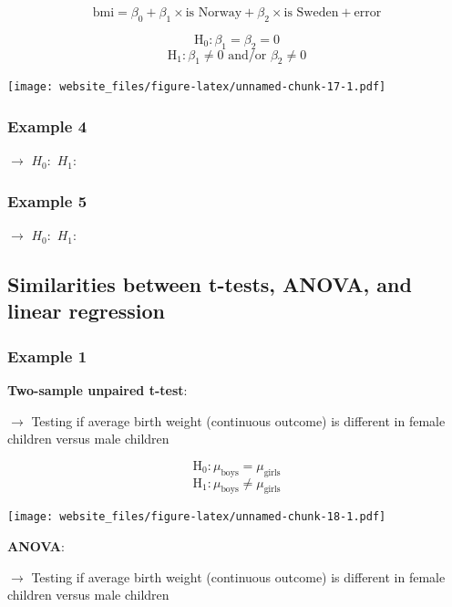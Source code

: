 \documentclass[12pt,]{article}
\begin{document}
\[\text{bmi} = \beta_0 + \beta_1 \times \text{is Norway} + \beta_2 \times \text{is Sweden} + \text{error}\]

\[\text{H}_0: \beta_1 = \beta_2 = 0\]
\[\text{H}_1: \beta_1 \ne 0 \text{ and/or } \beta_2 \ne 0\]

\texttt{[image: website\_files/figure-latex/unnamed-chunk-17-1.pdf]}

\subsubsection{Example 4}\label{example-4-4}

\(\rightarrow\) \hfill \break
\hfill \break
\hfill \break
\hfill \break
\hfill \break
\hfill \break
\(H_0:\) \hfill \break
\hfill \break
\hfill \break
\(H_1:\)

\subsubsection{Example 5}\label{example-5}

\(\rightarrow\) \hfill \break
\hfill \break
\hfill \break
\hfill \break
\hfill \break
\hfill \break
\(H_0:\) \hfill \break
\hfill \break
\hfill \break
\(H_1:\)

\newpage

\subsection{Similarities between t-tests, ANOVA, and linear
regression}\label{similarities-between-t-tests-anova-and-linear-regression}

\subsubsection{Example 1}\label{example-1-5}

\textbf{Two-sample unpaired t-test}:

\(\rightarrow\) Testing if average birth weight (continuous outcome) is
different in female children versus male children

\[\text{H}_0: \mu_{\text{boys}} = \mu_{\text{girls}}\]
\[\text{H}_1: \mu_{\text{boys}} \ne \mu_{\text{girls}}\]

\texttt{[image: website\_files/figure-latex/unnamed-chunk-18-1.pdf]}

\newpage

\textbf{ANOVA}:

\(\rightarrow\) Testing if average birth weight (continuous outcome) is
different in female children versus male children
\end{document}
